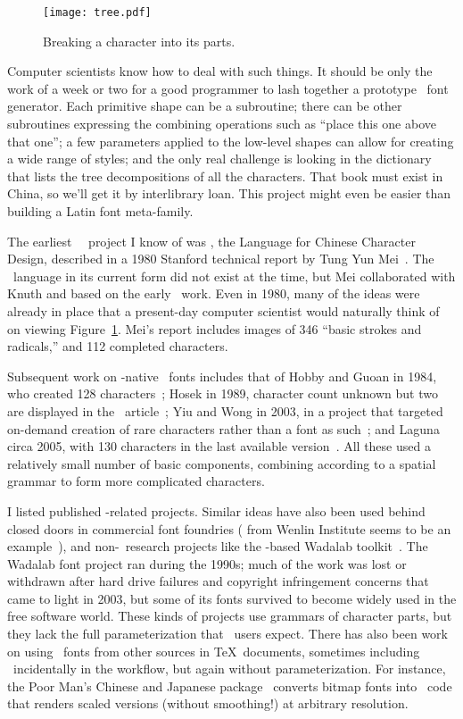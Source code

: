 \documentclass{ltugboat}
\begin{document}
\begin{figure}
\texttt{[image: tree.pdf]}
\caption{Breaking a character into its parts.}
\label{fig:tree}
\end{figure}

Computer scientists know how to deal with such things.  It should be only
the work of a week or two for a good programmer to lash together a prototype
\CJK\ font generator.  Each primitive shape can be a subroutine; there can
be other subroutines expressing the combining operations such as ``place
this one above that one''; a few parameters applied to the low-level shapes
can allow for creating a wide range of styles; and the only real challenge
is looking in the dictionary that lists the tree decompositions of all the
characters.  That book must exist in China, so we'll get it by interlibrary
loan.  This project might even be easier than building a Latin font
meta-family.

The earliest \MF\ \CJK\ project I know of was , the Language for
Chinese Character Design, described in a 1980 Stanford technical report by
Tung Yun Mei~\cite{Mei:LCCD}.  The \MF\ language in its current form did not
exist at the time, but Mei collaborated with Knuth and based  on
the early \MF\ work.  Even in 1980, many of the ideas were already in place
that a present-day computer scientist would naturally think of on viewing
Figure~\ref{fig:tree}.  Mei's report includes images of 346 ``basic strokes
and radicals,'' and 112 completed characters.

Subsequent work on \MF-native \CJK\ fonts includes that of Hobby and Guoan
in 1984, who created 128 characters~\cite{Hobby:Chinese}; Hosek in 1989,
character count unknown but two are displayed in the \TUB\
article~\cite{Hosek:Design}; Yiu and Wong in 2003, in a project that
targeted on-demand creation of rare characters rather than a font as
such~\cite{Yiu:Chinese}; and Laguna circa 2005, with 130 characters in the
last available version~\cite{Laguna:Hong}.  All these used a relatively
small number of basic components, combining according to a spatial grammar
to form more complicated characters.

I listed published \MF-related projects.  Similar ideas have also been used
behind closed doors in commercial font foundries (\acro{CDL} from Wenlin
Institute seems to be an example~\cite{Wenlin:CDL}), and non-\MF\ research
projects like the \acro{LISP}-based Wadalab toolkit~\cite{Tanaka:Wadalab}. 
The Wadalab font project ran during the 1990s; much of the work was lost or
withdrawn after hard drive failures and copyright infringement concerns that
came to light in 2003, but some of its fonts survived to become widely used
in the free software world.  These kinds of projects use grammars of
character parts, but they lack the full parameterization that \MF\ users
expect.  There has also been work on using \CJK\ fonts from other sources in
\TeX\ documents, sometimes including \MF\ incidentally in the workflow, but
again without parameterization.  For instance, the Poor Man's Chinese and
Japanese package~\cite{Ridgeway:Poor} converts bitmap fonts into \MF\ code
that renders scaled versions (without smoothing!) at arbitrary resolution.
\end{document}
